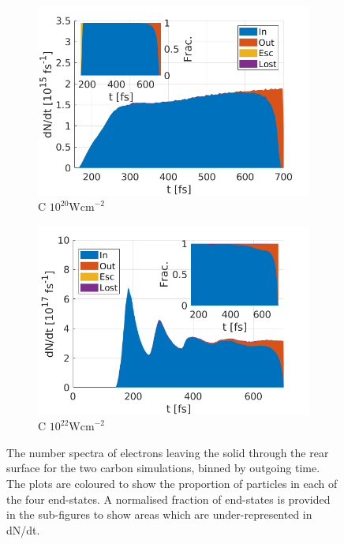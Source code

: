 \documentclass[12pt]{article}
\numberwithin{equation}{section}
\begin{document}
\begin{figure}
\centering
\begin{subfigure}{.49\textwidth}
  \centering
  \includegraphics[width=1\linewidth]{Figures/C_1e20_t_r.png}
  \caption{C $10^{20} \text{Wcm}^{-2}$}
\end{subfigure}%
\begin{subfigure}{.49\textwidth}
  \centering
  \includegraphics[width=1\linewidth]{Figures/C_1e22_t_r.png}
  \caption{C $10^{22} \text{Wcm}^{-2}$}
\end{subfigure}
\caption{The number spectra of electrons leaving the solid through the rear surface for the two carbon simulations, binned by outgoing time. The plots are coloured to show the proportion of particles in each of the four end-states. A normalised fraction of end-states is provided in the sub-figures to show areas which are under-represented in dN/dt.}
\label{fig:tnsa_fate_t}
\end{figure}
\end{document}
